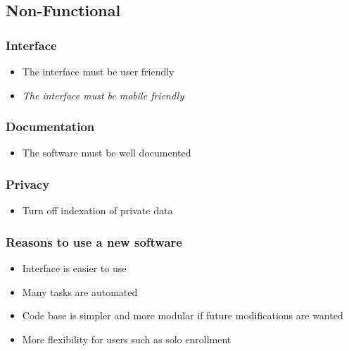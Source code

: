 \documentclass[a4paper, 12pt]{article}
\begin{document}
\subsection*{Non-Functional}


\subsubsection*{Interface}
	
	\begin{itemize}
		\item The interface must be user friendly
		\item \textit{The interface must be mobile friendly}
	\end{itemize}

\subsubsection*{Documentation}
	
	\begin{itemize}
		\item The software must be well documented

	\end{itemize}
	
\subsubsection*{Privacy}
    
    \begin{itemize}
    	\item Turn off indexation of private data

    \end{itemize}



\subsubsection*{Reasons to use a new software}


	\begin{itemize}
		\item Interface is easier to use
		\item Many tasks are automated
		\item Code base is simpler and more modular if future modifications are wanted
		\item More flexibility for users such as solo enrollment
	\end{itemize}
\end{document}
